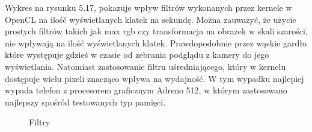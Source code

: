 Wykres na rysunku 5.17, pokazuje wpływ filtrów wykonanych przez kernele w OpenCL na ilość wyświetlanych klatek na sekundę. Można zauważyć, że użycie prostych filtrów takich jak max rgb czy transformacja na obrazek w skali szarości, nie wpływają na ilość wyświetlanych klatek. Prawdopodobnie przez wąskie gardło które występuje gdzieś w czasie od zebrania podglądu z kamery do jego wyświetlania. Natomiast zastosowanie filtru uśredniającego, który w kernelu dostępuje wielu pixeli znacząco wpływa na wydajność. W tym wypadku najlepiej wypada telefon z procesorem graficznym Adreno 512, w którym zastosowano najlepszy spośród testowanych typ pamięci.

\begin{figure}[H]
\caption{Filtry}
\end{figure}





